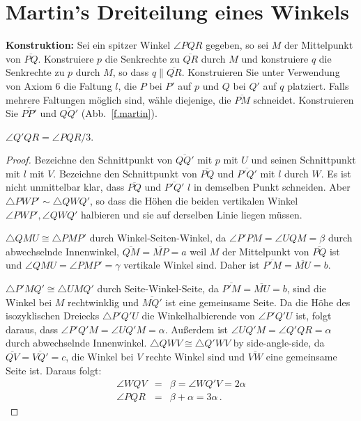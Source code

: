 
\section{Martin's Dreiteilung eines Winkels}\label{s.martin-trisection}



\noindent\textbf{Konstruktion:}
Sei ein spitzer Winkel $\angle PQR$ gegeben, so sei $M$ der Mittelpunkt von $\overline{PQ}$. Konstruiere $p$ die Senkrechte zu $\overline{QR}$ durch $M$ und konstruiere $q$ die Senkrechte zu $p$ durch $M$, so dass $q\parallel\overline{QR}$. Konstruieren Sie unter Verwendung von Axiom 6 die Faltung $l$, die $P$ bei $P'$ auf $p$ und $Q$ bei $Q'$ auf $q$ platziert. Falls mehrere Faltungen möglich sind, wähle diejenige, die $\overline{PM}$ schneidet. Konstruieren Sie $\overline{PP'}$ und $\overline{QQ'}$ (Abb.~\ref{f.martin}).

\begin{theorem}
$\angle Q'QR=\angle PQR/3$.
\end{theorem}
\begin{proof}
Bezeichne den Schnittpunkt von $\overline{QQ'}$ mit $p$ mit $U$ und seinen Schnittpunkt mit $l$ mit $V$. Bezeichne den Schnittpunkt von $\overline{PQ}$ und $\overline{P'Q'}$ mit $l$ durch $W$. Es ist nicht unmittelbar klar, dass $\overline{PQ}$ und $\overline{P'Q'}$ $l$ in demselben Punkt schneiden. Aber $\triangle PWP' \sim \triangle QWQ'$, so dass die Höhen die beiden vertikalen Winkel $\angle PWP', \angle QWQ'$ halbieren und sie auf derselben Linie liegen müssen.

$\triangle QMU\cong \triangle PMP'$ durch Winkel-Seiten-Winkel, da $\angle P'PM=\angle UQM=\beta$ durch abwechselnde Innenwinkel, $\overline{QM}=\overline{MP}=a$ weil $M$ der Mittelpunkt von $\overline{PQ}$ ist und $\angle QMU=\angle PMP'=\gamma$ vertikale Winkel sind. Daher ist $\overline{P'M}=\overline{MU}=b$.

$\triangle P'MQ'\cong \triangle UMQ'$ durch Seite-Winkel-Seite, da $\overline{P'M}=\overline{MU}=b$, sind die Winkel bei $M$ rechtwinklig und $\overline{MQ'}$ ist eine gemeinsame Seite. Da die Höhe des isozyklischen Dreiecks $\triangle P'Q'U$ die Winkelhalbierende von $\angle P'Q'U$ ist, folgt daraus, dass $\angle P'Q'M=\angle UQ'M=\alpha$. Außerdem ist $\angle UQ'M=\angle Q'QR=\alpha$ durch abwechselnde Innenwinkel. $\triangle QWV\cong\triangle Q'WV$ by side-angle-side, da $\overline{QV}=\overline{VQ'}=c$, die Winkel bei $V$ rechte Winkel sind und $\overline{VW}$ eine gemeinsame Seite ist. Daraus folgt:
\begin{eqnarray*}
\angle WQV&=&\beta=\angle WQ'V=2\alpha\\
\angle PQR &=& \beta + \alpha = 3\alpha\,.
\end{eqnarray*}
\end{proof}

